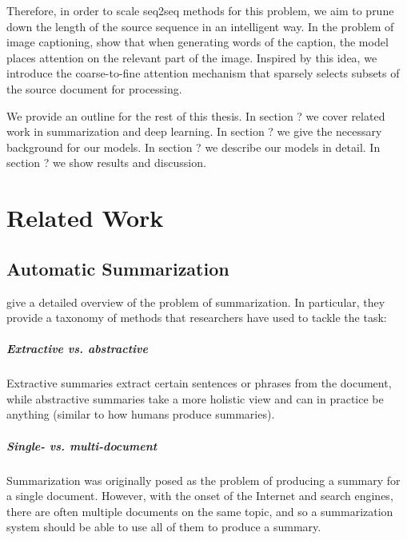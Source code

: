 \documentclass[11pt]{report}
\begin{document}
Therefore, in order to scale seq2seq methods for this problem, we aim to prune down the length of the source sequence in an intelligent way. In the problem of image captioning, \citet{xu2015captioning} show that when generating words of the caption, the model places attention on the relevant part of the image.
Inspired by this idea, we introduce the coarse-to-fine attention mechanism that sparsely selects subsets of the source document for processing.


We provide an outline for the rest of this thesis.
In section ? we cover related work in summarization and deep learning.
In section ? we give the necessary background for our models.
In section ? we describe our models in detail.
In section ? we show results and discussion.




\chapter{Related Work}

\section{Automatic Summarization}

\citet{Nenkova2011} give a detailed overview of the problem of summarization. In particular, they provide a taxonomy of methods that researchers have used to tackle the task:

\paragraph{Extractive vs. abstractive} Extractive summaries extract certain sentences or phrases from the document, while abstractive summaries take a more holistic view and can in practice be anything (similar to how humans produce summaries). 

\paragraph{Single- vs. multi-document} Summarization was originally posed as the problem of producing a summary for a single document. However, with the onset of the Internet and search engines, there are often multiple documents on the same topic, and so a summarization system should be able to use all of them to produce a summary.

\end{document}
